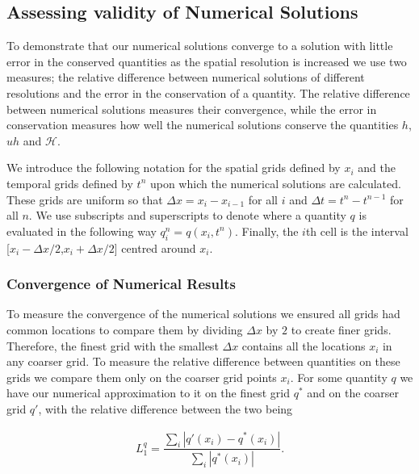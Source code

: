\documentclass[times]{elsarticle}
\begin{document}
\subsection{Assessing validity of Numerical Solutions}
To demonstrate that our numerical solutions converge to a solution with little error in the conserved quantities as the spatial resolution is increased we use two measures; the relative difference between numerical solutions of different resolutions and the error in the conservation of a quantity. The relative difference between numerical solutions measures their convergence, while the error in conservation measures how well the numerical solutions conserve the quantities $h$, $uh$ and $\mathcal{H}$.

We introduce the following notation for the spatial grids defined by $x_i$ and the temporal grids defined by $t^n$ upon which the numerical solutions are calculated. These grids are uniform so that $\Delta x = x_{i} - x_{i-1}$ for all $ i$ and $\Delta t = t^{n} - t^{n-1}$ for all $n$. We use subscripts and superscripts to denote where a quantity $q$ is evaluated in the following way $q_i^n = q(x_i,t^n)$. Finally, the $i$th cell is the interval [$x_i -\Delta x/2$,$x_i +\Delta x/2$] centred around $x_{i}$. 

\subsubsection{Convergence of Numerical Results}
To measure the convergence of the numerical solutions we ensured all grids had common locations to compare them by dividing $\Delta x$ by $2$ to create finer grids. Therefore, the finest grid with the smallest $\Delta x$ contains all the locations $x_i$ in any coarser grid. To measure the relative difference between quantities on these grids we compare them only on the coarser grid points $x_i$. For some quantity $q$ we have our numerical approximation to it on the finest grid $q^*$ and on the coarser grid $q'$, with the relative difference between the two being
\begin{linenomath*}
	\begin{gather}
	L_1^{q} = \dfrac{\sum_{i} \left| q'(x_i)  - q^*(x_i)\right|}{\sum_{i} \left| q^*(x_i)\right|}.
	\label{eq:L1def}
	\end{gather}
\end{linenomath*}
\end{document}
